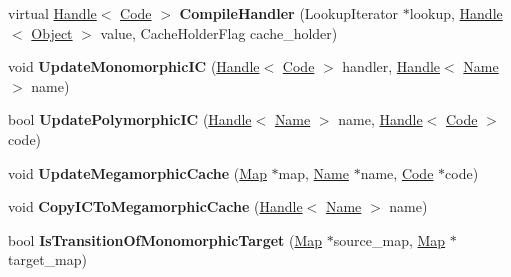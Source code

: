 \begin{DoxyCompactItemize}
\item 
virtual \hyperlink{classv8_1_1internal_1_1_handle}{Handle}$<$ \hyperlink{classv8_1_1internal_1_1_code}{Code} $>$ {\bfseries Compile\+Handler} (Lookup\+Iterator $\ast$lookup, \hyperlink{classv8_1_1internal_1_1_handle}{Handle}$<$ \hyperlink{classv8_1_1internal_1_1_object}{Object} $>$ value, Cache\+Holder\+Flag cache\+\_\+holder)\hypertarget{classv8_1_1internal_1_1_i_c_a943c59149661d5e3d3d2753eb1ee8ba6}{}\label{classv8_1_1internal_1_1_i_c_a943c59149661d5e3d3d2753eb1ee8ba6}

\item 
void {\bfseries Update\+Monomorphic\+IC} (\hyperlink{classv8_1_1internal_1_1_handle}{Handle}$<$ \hyperlink{classv8_1_1internal_1_1_code}{Code} $>$ handler, \hyperlink{classv8_1_1internal_1_1_handle}{Handle}$<$ \hyperlink{classv8_1_1internal_1_1_name}{Name} $>$ name)\hypertarget{classv8_1_1internal_1_1_i_c_a9487c32a2748a45c4b35995ecbeb79c6}{}\label{classv8_1_1internal_1_1_i_c_a9487c32a2748a45c4b35995ecbeb79c6}

\item 
bool {\bfseries Update\+Polymorphic\+IC} (\hyperlink{classv8_1_1internal_1_1_handle}{Handle}$<$ \hyperlink{classv8_1_1internal_1_1_name}{Name} $>$ name, \hyperlink{classv8_1_1internal_1_1_handle}{Handle}$<$ \hyperlink{classv8_1_1internal_1_1_code}{Code} $>$ code)\hypertarget{classv8_1_1internal_1_1_i_c_adafd09efd250b79ba9358b7baa61dec1}{}\label{classv8_1_1internal_1_1_i_c_adafd09efd250b79ba9358b7baa61dec1}

\item 
void {\bfseries Update\+Megamorphic\+Cache} (\hyperlink{classv8_1_1internal_1_1_map}{Map} $\ast$map, \hyperlink{classv8_1_1internal_1_1_name}{Name} $\ast$name, \hyperlink{classv8_1_1internal_1_1_code}{Code} $\ast$code)\hypertarget{classv8_1_1internal_1_1_i_c_a600352ca56064d621c7a6eccbe8cae7b}{}\label{classv8_1_1internal_1_1_i_c_a600352ca56064d621c7a6eccbe8cae7b}

\item 
void {\bfseries Copy\+I\+C\+To\+Megamorphic\+Cache} (\hyperlink{classv8_1_1internal_1_1_handle}{Handle}$<$ \hyperlink{classv8_1_1internal_1_1_name}{Name} $>$ name)\hypertarget{classv8_1_1internal_1_1_i_c_aa7a45201b57aadcc703589595732dd27}{}\label{classv8_1_1internal_1_1_i_c_aa7a45201b57aadcc703589595732dd27}

\item 
bool {\bfseries Is\+Transition\+Of\+Monomorphic\+Target} (\hyperlink{classv8_1_1internal_1_1_map}{Map} $\ast$source\+\_\+map, \hyperlink{classv8_1_1internal_1_1_map}{Map} $\ast$target\+\_\+map)\hypertarget{classv8_1_1internal_1_1_i_c_a83a598f66df33606287db27e536e652f}{}\label{classv8_1_1internal_1_1_i_c_a83a598f66df33606287db27e536e652f}


\end{DoxyCompactItemize}
